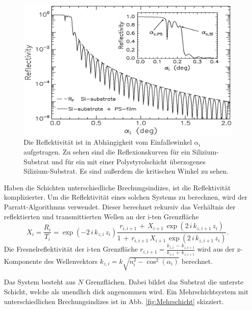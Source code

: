 \begin{figure}
    \centering
    \includegraphics[width=0.7\linewidth]{./figures/Kurve.png}
    \caption{Die Reflektivität ist in Abhängigkeit vom Einfallswinkel $\alpha_i$ aufgetragen. Zu sehen sind die Reflexionskurven für ein Silizium-Substrat und für ein mit einer Polystyrolschicht überzogenes Silizium-Substrat. Es sind außerdem die kritischen Winkel zu sehen. \cite{V44old}}
    \label{fig:Kurve}
\end{figure}

Haben die Schichten unterschiedliche Brechungsindizes, ist die Reflektivität komplizierter. Um die Reflektivität eines solchen Systems zu berechnen, wird der Parratt-Algorithmus verwendet.
Dieser berechnet rekursiv das Verhältnis der reflektierten und transmittierten Wellen an der i-ten Grenzfläche
\begin{equation}
    X_i = \frac{R_i}{T_i} = \exp(-2 \, i \, k_{z,i} \, z_i) \frac{r_{i, i+1} \, + \, X_{i+1} \, \exp(2 \, i \, k_{z,i+1} \, z_i)}{1 \, + \, r_{i,i+1} \, X_{i+1} \, \exp(2 \, i \, k_{z,i+1} \, z_i)}.
    \label{eq:parratt}
\end{equation}
Die Fresnelreflektivität der i-ten Grenzfläche $r_{i, i+1} = \frac{k_{z,i} \, - \, k_{z,i+1}}{k_{z,i} \, + \, k_{z,i+1}}$ wird aus der z-Komponente des Wellenvektors $k_{z,i} = k \sqrt{n^2_i - \cos^2(\alpha_i)}$ berechnet.

Das System besteht aus $N$ Grenzflächen. Dabei bildet das Substrat die unterste Schicht, welche als unendlich dick angenommen wird.
Ein Mehrschichtsystem mit unterschiedlichen Brechungsindizes ist in Abb. \ref{fig:Mehrschicht} skizziert.

